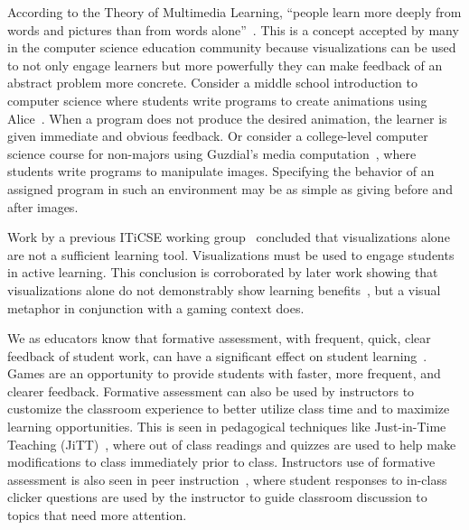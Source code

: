 \documentclass{sig-alternate-05-2015}
\begin{document}
According to the Theory of Multimedia Learning, ``people learn more deeply from words and pictures than from words alone''~\cite{mayer2014cognitive}. This is a concept accepted by many in the computer science education community because visualizations can be used to not only engage learners but more powerfully they can make feedback of an abstract problem more concrete. Consider a middle school introduction to computer science where students write programs to create animations using Alice~\cite{dann2000making}. When a program does not produce the desired animation, the learner is given immediate and obvious feedback. Or consider a college-level computer science course for non-majors using Guzdial's media computation~\cite{guzdial2003media}, where students write programs to manipulate images. Specifying the behavior of an assigned program in such an environment may be as simple as giving before and after images.



Work by a previous ITiCSE working group~\cite{naps03exploring} concluded that visualizations alone are not a sufficient learning tool. Visualizations must be used to engage students in active learning. This conclusion is corroborated by later work showing that visualizations alone do not demonstrably show learning benefits~\cite{rieber2008games}, but a visual metaphor in conjunction with a gaming context does.

We as educators know that formative assessment, with frequent, quick, clear feedback of student work, can have a significant effect on student learning~\cite{black1998assessment}. Games are an opportunity to provide students with faster, more frequent, and clearer feedback. Formative assessment can also be used by instructors to customize the classroom experience to better utilize class time and to maximize learning opportunities. This is seen in pedagogical techniques like Just-in-Time Teaching (JiTT)~\cite{bailey2005just}, where out of class readings and quizzes are used to help make modifications to class immediately prior to class. Instructors use of formative assessment is also seen in peer instruction~\cite{simon2010experience}, where student responses to in-class clicker questions are used by the instructor to guide classroom discussion to topics that need more attention.
\end{document}
